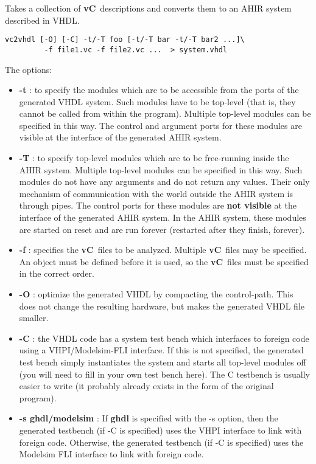 \documentclass{article}
\newcommand{\vC}{{\bf vC}~}
\begin{document}
Takes a collection of \vC descriptions and converts them to
an AHIR system described in VHDL.
\begin{verbatim}
vc2vhdl [-O] [-C] -t/-T foo [-t/-T bar -t/-T bar2 ...]\
         -f file1.vc -f file2.vc ...  > system.vhdl
\end{verbatim}

The options:
\begin{itemize}
\item {\bf -t} : to specify the modules which are to be 
accessible from the ports of the generated VHDL system.
Such modules have to be top-level (that is, they cannot
be called from within the program).
Multiple top-level modules can be specified in this way.
The control and argument ports for these modules are
visible at the interface of the generated AHIR system.
\item {\bf -T} : to specify top-level modules which are to be 
free-running inside the AHIR system.
Multiple top-level modules can be specified in this way.
Such modules do not have any arguments and do not return
any values.  Their only mechanism of communication with
the world outside the AHIR system is through pipes.
The control ports for these modules are
{\bf not visible} at the interface of the generated AHIR system.
In the AHIR system, these modules are started on reset
and are run forever (restarted after they finish, forever).
\item {\bf -f} : specifies the \vC files to be analyzed. 
Multiple \vC files may be specified.  An object must be
defined before it is used, so the \vC files must be 
specified in the correct order.
\item {\bf -O} : optimize the generated VHDL by compacting
the control-path.  This does not change the resulting
hardware, but makes the generated VHDL file smaller.
\item {\bf -C} : the VHDL code has a system test bench which
interfaces to foreign code using a VHPI/Modelsim-FLI interface.
If this is not specified, the  generated test bench simply
instantiates the system and starts all top-level modules
off (you will need to fill in your own test bench here).
The C testbench is usually easier to write (it probably
already exists in the form of the original program).
\item {\bf -s ghdl/modelsim} :  If {\bf ghdl} is specified
with the -s option, then the generated testbench (if -C is specified)
uses the VHPI interface to link with foreign code.  Otherwise,
the generated testbench (if -C is specified) uses the Modelsim FLI
interface to link with foreign code.
\end{itemize}
\end{document}

